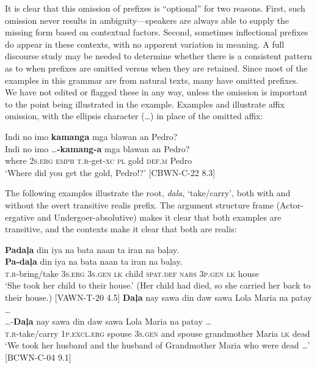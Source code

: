 It is clear that this omission of prefixes is “optional” for two reasons. First, such omission never results in ambiguity—speakers are always able to supply the missing form based on contextual factors. Second, sometimes inflectional prefixes do appear in these contexts, with no apparent variation in meaning. A full discourse study may be needed to determine whether there is a consistent pattern as to when prefixes are omitted versus when they are retained. Since most of the examples in this grammar are from natural texts, many have omitted prefixes. We have not edited or flagged these in any way, unless the omission is important to the point being illustrated in the example. Examples  and  illustrate affix omission, with the ellipsis character (…) in place of the omitted affix:

\ea
\label{bkm:Ref119307770}
Indi  no  imo  \textbf{kamanga}  mga  blawan  an  Pedro? \\\smallskip
 \gll Indi  no  imo  …\textbf{-kamang-a}  mga  blawan  an  Pedro? \\
where  2\textsc{s.erg}  \textsc{emph}  \textsc{t.r}-get-\textsc{xc}  \textsc{pl}  gold  \textsc{def.m}  Pedro \\
\glt ‘Where did you get the gold, Pedro!?' [CBWN-C-22 8.3]
\z

The following examples illustrate the root, \textit{dala}, ‘take/carry’, both with  and without  the overt transitive realis prefix. The argument structure frame (Actor-ergative and Undergoer-absolutive) makes it clear that both examples are transitive, and the contexts make it clear that both are realis:

\ea
\label{bkm:Ref394992438}
\textbf{Padaļa}  din  iya  na  bata  naan  ta   iran  na  baļay. \\\smallskip
 \gll \textbf{Pa-daļa}  din  iya  na  bata  naan  ta   iran  na  baļay. \\
\textsc{t.r}-bring/take  3\textsc{s.erg}  3\textsc{s.gen}  \textsc{lk}  child  \textsc{spat.def}  \textsc{nabs}  3\textsc{p.gen}  \textsc{lk}  house \\
\glt ‘She took her child to their house.’ (Her child had died, so she carried her back to their house.) [VAWN-T-20 4.5]
\z
\ea
\label{bkm:Ref119307774}\label{bkm:Ref394992440}
\textbf{Daļa}  nay  sawa  din  daw  sawa  Lola  Maria na  patay … \\\smallskip
 \gll …-\textbf{Daļa}  nay  sawa  din  daw  sawa  Lola  Maria na  patay … \\
\textsc{\textsc{t.r}}-take/carry  1\textsc{p.excl.erg}  spouse  3\textsc{s.gen}  and  spouse  grandmother  Maria \textsc{lk}  dead \\
\glt `We took her husband and the husband of Grandmother Maria who were dead …’
[BCWN-C-04 9.1]
\z

